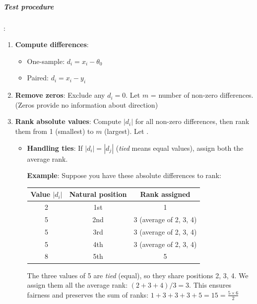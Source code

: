 \subparagraph{Test procedure}:

\begin{enumerate}
    \item \textbf{Compute differences}:
        \begin{itemize}
            \item One-sample: $d_i = x_i - \theta_0$
            \item Paired: $d_i = x_i - y_i$
        \end{itemize}

    \item \textbf{Remove zeros}: Exclude any $d_i = 0$. Let $m$ = number of non-zero differences.
        (Zeros provide no information about direction)

    \item \textbf{Rank absolute values}: Compute $|d_i|$ for all non-zero differences, then
        rank them from 1 (smallest) to $m$ (largest). Let .
        \begin{itemize}
            \item \textbf{Handling ties}: If $|d_i| = |d_j|$ (\emph{tied} means equal values),
                assign both the average rank.

                \textbf{Example}: Suppose you have these absolute differences to rank:

                \begin{center}
                \begin{tabular}{|c|c|c|}
                    \hline
                    \textbf{Value $|d_i|$} & \textbf{Natural position} & \textbf{Rank assigned} \\
                    \hline
                    2 & 1st & 1 \\
                    \hline
                    5 & 2nd & 3 (average of 2, 3, 4) \\
                    5 & 3rd & 3 (average of 2, 3, 4) \\
                    5 & 4th & 3 (average of 2, 3, 4) \\
                    \hline
                    8 & 5th & 5 \\
                    \hline
                \end{tabular}
                \end{center}

                The three values of 5 are \emph{tied} (equal), so they share positions 2, 3, 4.
                We assign them all the average rank: $(2+3+4)/3 = 3$. This ensures fairness
                and preserves the sum of ranks: $1 + 3 + 3 + 3 + 5 = 15 = \frac{5 \times 6}{2}$
        \end{itemize}


\end{enumerate}
